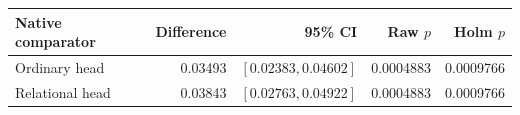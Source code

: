 \begin{tabular*}{\linewidth}{@{\extracolsep{\fill}}lrrrr@{}}\toprule
Native comparator & Difference & 95\% CI & Raw $p$ & Holm $p$\\\midrule
Ordinary head & 0.03493 & $[0.02383,0.04602]$ & 0.0004883 & 0.0009766\\
Relational head & 0.03843 & $[0.02763,0.04922]$ & 0.0004883 & 0.0009766\\
\bottomrule\end{tabular*}
